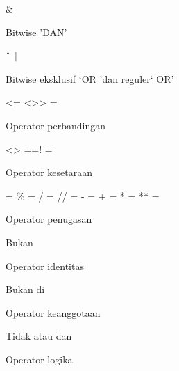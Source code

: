 \vspace{12pt}
\noindent
 $  \&  $ \par
\noindent
Bitwise 'DAN' \par
\vspace{12pt}
\noindent
 $  \string^  $  $  \vert  $ \par
\noindent
Bitwise eksklusif `OR 'dan reguler` OR' \par
\vspace{12pt}
\noindent
<= <>> = \par
\noindent
Operator perbandingan \par
\vspace{12pt}
\noindent
<> ==! = \par
\noindent
Operator kesetaraan \par
\vspace{12pt}
\noindent
= $  \%  $ = / = // = - = + = * = ** = \par
\noindent
Operator penugasan \par
\vspace{12pt}
\noindent
Bukan \par
\noindent
Operator identitas \par
\vspace{12pt}
\noindent
Bukan di \par
\noindent
Operator keanggotaan \par
\vspace{12pt}
\noindent
Tidak atau dan \par
\noindent
Operator logika \par
\vspace{12pt}
\vspace{12pt}

